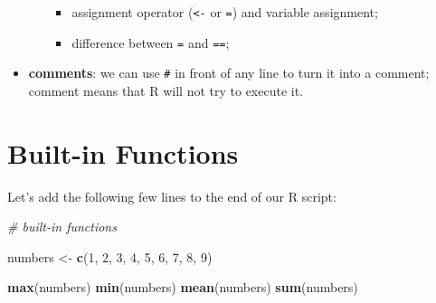 \documentclass[
]{book}
\newenvironment{Shaded}{\begin{snugshade}}{\end{snugshade}}
\newcommand{\CommentTok}[1]{\textcolor[rgb]{0.56,0.35,0.01}{\textit{#1}}}
\newcommand{\DecValTok}[1]{\textcolor[rgb]{0.00,0.00,0.81}{#1}}
\newcommand{\FunctionTok}[1]{\textcolor[rgb]{0.13,0.29,0.53}{\textbf{#1}}}
\newcommand{\NormalTok}[1]{#1}
\newcommand{\OtherTok}[1]{\textcolor[rgb]{0.56,0.35,0.01}{#1}}
\providecommand{\tightlist}{%
  \setlength{\itemsep}{0pt}\setlength{\parskip}{0pt}}
\begin{document}
\begin{itemize}
\begin{itemize}
    \begin{itemize}
    \tightlist
    \item
      assignment operator (\texttt{\textless{}-} or \texttt{=}) and variable assignment;
    \item
      difference between \texttt{=} and \texttt{==};
    \end{itemize}
  \end{itemize}
\item
  \textbf{comments}: we can use \texttt{\#} in front of any line to turn it into a comment; comment means that R will not try to execute it.
\end{itemize}

\hypertarget{built-in-functions}{%
\section{Built-in Functions}\label{built-in-functions}}

Let's add the following few lines to the end of our R script:

\begin{Shaded}
\begin{Highlighting}[]
\CommentTok{\# built{-}in functions}

\NormalTok{numbers }\OtherTok{\textless{}{-}} \FunctionTok{c}\NormalTok{(}\DecValTok{1}\NormalTok{, }\DecValTok{2}\NormalTok{, }\DecValTok{3}\NormalTok{, }\DecValTok{4}\NormalTok{, }\DecValTok{5}\NormalTok{, }\DecValTok{6}\NormalTok{, }\DecValTok{7}\NormalTok{, }\DecValTok{8}\NormalTok{, }\DecValTok{9}\NormalTok{)}

\FunctionTok{max}\NormalTok{(numbers)}
\FunctionTok{min}\NormalTok{(numbers)}
\FunctionTok{mean}\NormalTok{(numbers)}
\FunctionTok{sum}\NormalTok{(numbers)}
\end{Highlighting}
\end{Shaded}
\end{document}

